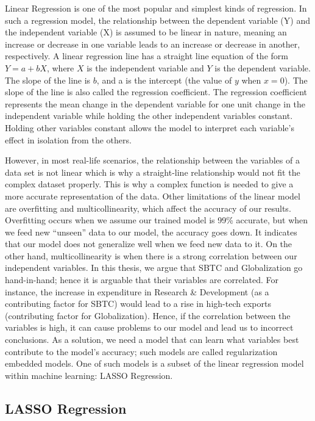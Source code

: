 \hspace{20pt}Linear Regression is one of the most popular and simplest kinds of regression. In such a regression model, the relationship between the dependent variable (Y) and the independent variable (X) is assumed to be linear in nature, meaning an increase or decrease in one variable leads to an increase or decrease in another, respectively. A linear regression line has a straight line equation of the form $Y = a + bX$, where $X$ is the independent variable and $Y$ is the dependent variable. The slope of the line is $b$, and a is the intercept  (the value of $y$ when $x = 0$). The slope of the line is also called the regression coefficient. The regression coefficient represents the mean change in the dependent variable for one unit change in the independent variable while holding the other independent variables constant. Holding other variables constant allows the model to interpret each variable’s effect in isolation from the others.

However, in most real-life scenarios, the relationship between the variables of a data set is not linear which is why a straight-line relationship would not fit the complex dataset properly. This is why a complex function is needed to give a more accurate representation of the data. Other limitations of the linear model are overfitting and multicollinearity, which affect the accuracy of our results. Overfitting occurs when we assume our trained model is 99\% accurate, but when we feed new “unseen” data to our model, the accuracy goes down. It indicates that our model does not generalize well when we feed new data to it. On the other hand, multicollinearity is when there is a strong correlation between our independent variables. In this thesis, we argue that SBTC and Globalization go hand-in-hand; hence it is arguable that their variables are correlated. For instance, the increase in expenditure in Research & Development (as a contributing factor for SBTC) would lead to a rise in high-tech exports (contributing factor for Globalization). Hence, if the correlation between the variables is high, it can cause problems to our model and lead us to incorrect conclusions. As a solution, we need a model that can learn what variables best contribute to the model’s accuracy; such models are called regularization embedded models. One of such models is a subset of the linear regression model within machine learning: LASSO Regression.

\subsection{LASSO Regression}

